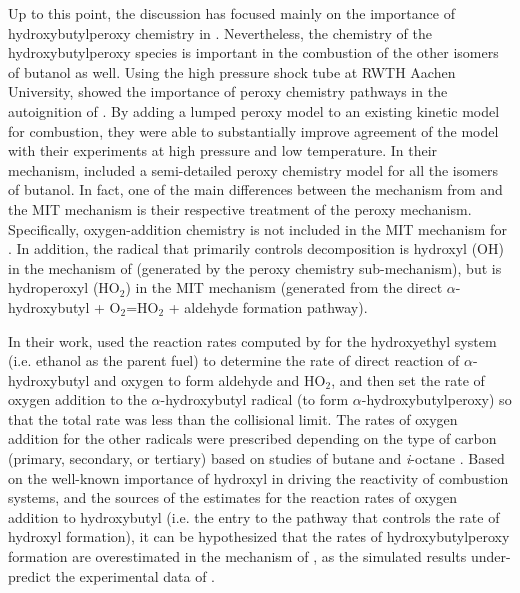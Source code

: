 \documentclass[../main.tex]{subfiles}
\begin{document}
Up to this point, the discussion has focused mainly on the importance of
hydroxybutylperoxy chemistry in \tBuOH{}. Nevertheless, the chemistry
of the hydroxybutylperoxy species is important in the combustion of the other
isomers of butanol as well. Using the high pressure shock tube at RWTH Aachen
University, \textcite{Vranckx2011} showed the importance of peroxy chemistry
pathways in the autoignition of \nBuOH{}. By adding a lumped peroxy
model to an existing kinetic model for \nBuOH{} combustion, they were
able to substantially improve agreement of the model with their experiments at
high pressure and low temperature. In their mechanism, \textcite{Sarathy2012}
included a semi-detailed peroxy chemistry model for all the isomers of butanol.
In fact, one of the main differences between the mechanism from
\textcite{Sarathy2012} and the MIT mechanism \cite{Hansen2013,Merchant2013} is
their respective treatment of the peroxy mechanism. Specifically,
oxygen-addition chemistry is not included in the MIT mechanism for
\iBuOH{} \cite{Hansen2013,Merchant2013}. In addition, the radical
that primarily controls \iBuOH{} decomposition is hydroxyl (OH) in
the mechanism of \textcite{Sarathy2012} (generated by the peroxy chemistry
sub-mechanism), but is hydroperoxyl (HO$_2$) in the MIT mechanism
\cite{Hansen2013,Merchant2013} (generated from the direct $\alpha$-hydroxybutyl
+ O$_2$=HO$_2$ + aldehyde formation pathway).

In their work, \textcite{Sarathy2012} used the reaction rates computed by
\textcite{DaSilva2009} for the hydroxyethyl system (i.e. ethanol as the parent
fuel) to determine the rate of direct reaction of $\alpha$-hydroxybutyl and
oxygen to form aldehyde and HO$_2$, and then set the rate of oxygen addition to
the $\alpha$-hydroxybutyl radical (to form $\alpha$-hydroxybutylperoxy) so that
the total rate was less than the collisional limit. The rates of oxygen
addition for the other radicals were prescribed depending on the type of carbon
(primary, secondary, or tertiary) based on studies of butane and
\textit{i}-octane \cite{Sarathy2012}. Based on the well-known importance of
hydroxyl in driving the reactivity of combustion systems, and the sources of
the estimates for the reaction rates of oxygen addition to hydroxybutyl (i.e.
the entry to the pathway that controls the rate of hydroxyl formation), it can
be hypothesized that the rates of hydroxybutylperoxy formation are
overestimated in the mechanism of \textcite{Sarathy2012}, as the simulated
results under-predict the experimental data of \iBuOH{}.
\end{document}

